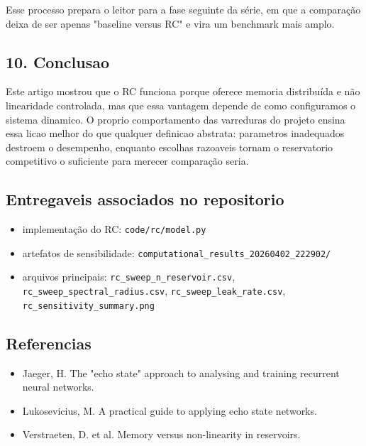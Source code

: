 \documentclass[12pt]{article}
\providecommand{\tightlist}{%
          \setlength{\itemsep}{0pt}\setlength{\parskip}{0pt}}
\begin{document}
Esse processo prepara o leitor para a fase seguinte da série, em que a comparação deixa de ser apenas "baseline versus RC" e vira um benchmark mais amplo.

\subsection{10. Conclusao}\label{10-conclusao}

Este artigo mostrou que o RC funciona porque oferece memoria distribuída e não linearidade controlada, mas que essa vantagem depende de como configuramos o sistema dinamico. O proprio comportamento das varreduras do projeto ensina essa licao melhor do que qualquer definicao abstrata: parametros inadequados destroem o desempenho, enquanto escolhas razoaveis tornam o reservatorio competitivo o suficiente para merecer comparação seria.

\subsection{Entregaveis associados no repositorio}\label{entregaveis-associados-no-repositorio}

\begin{itemize}
\tightlist
\item
  implementação do RC: \texttt{code/rc/model.py}
\item
  artefatos de sensibilidade: \texttt{computational\_results\_20260402\_222902/}
\item
  arquivos principais: \texttt{rc\_sweep\_n\_reservoir.csv}, \texttt{rc\_sweep\_spectral\_radius.csv}, \texttt{rc\_sweep\_leak\_rate.csv}, \texttt{rc\_sensitivity\_summary.png}
\end{itemize}

\subsection{Referencias}\label{referencias}

\begin{itemize}
\tightlist
\item
  Jaeger, H. The "echo state" approach to analysing and training recurrent neural networks.
\item
  Lukosevicius, M. A practical guide to applying echo state networks.
\item
  Verstraeten, D. et al. Memory versus non-linearity in reservoirs.
\end{itemize}

        
\end{document}
